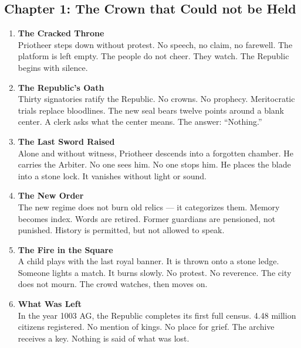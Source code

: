 \documentclass[9pt]{article}
\begin{document}
\subsection*{Chapter 1: The Crown that Could not be Held}

\vspace{1in}

\begin{center}
\begin{enumerate}
    \item \textbf{The Cracked Throne} \\
    Priotheer steps down without protest. No speech, no claim, no farewell. The platform is left empty. The people do not cheer. They watch. The Republic begins with silence.

    \vspace{.3in}
    \item \textbf{The Republic's Oath} \\
    Thirty signatories ratify the Republic. No crowns. No prophecy. Meritocratic trials replace bloodlines. The new seal bears twelve points around a blank center. A clerk asks what the center means. The answer: “Nothing.”

    \vspace{.3in}
    \item \textbf{The Last Sword Raised} \\
    Alone and without witness, Priotheer descends into a forgotten chamber. He carries the Arbiter. No one sees him. No one stops him. He places the blade into a stone lock. It vanishes without light or sound.

    \vspace{.3in}
    \item \textbf{The New Order} \\
    The new regime does not burn old relics — it categorizes them. Memory becomes index. Words are retired. Former guardians are pensioned, not punished. History is permitted, but not allowed to speak.

    \vspace{.3in}
    \item \textbf{The Fire in the Square} \\
    A child plays with the last royal banner. It is thrown onto a stone ledge. Someone lights a match. It burns slowly. No protest. No reverence. The city does not mourn. The crowd watches, then moves on.

    \vspace{.3in}
    \item \textbf{What Was Left} \\
    In the year 1003 AG, the Republic completes its first full census. 4.48 million citizens registered. No mention of kings. No place for grief. The archive receives a key. Nothing is said of what was lost.

\end{enumerate}
\end{center}
\end{document}

